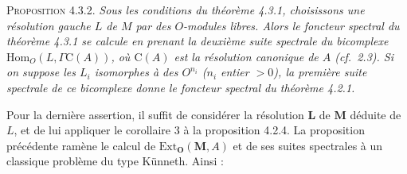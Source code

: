 \textsc{Proposition 4.3.2.} \textit{Sous les conditions du théorème
\textup{4.3.1}, choisissons une résolution gauche $L$ de $M$ par des $O$-modules
libres. Alors le foncteur spectral du théorème \textup{4.3.1} se calcule en prenant la
deuxième suite spectrale du bicomplexe $\mathrm{Hom}_O(L,\Gamma \mathrm C(A))$, où
$\mathrm C(A)$ est la résolution canonique de $A$ \textup{(}cf.\ \textup{2.3)}. Si on suppose les $L_i$
isomorphes à des $O^{n_i}$ \textup{(}$n_i$ entier $>0$\textup{)}, la première suite spectrale de
ce bicomplexe donne le foncteur spectral du théorème \textup{4.2.1}.}

Pour la dernière assertion, il suffit de considérer la résolution $\mathbf L$
de $\mathbf M$ déduite de $L$, et de lui appliquer le corollaire 3 à la
proposition 4.2.4.
La proposition précédente ramène le calcul de
$\mathrm{Ext}_{\mathbf O}(\mathbf M,A)$ et de ses suites spectrales à un
classique problème du type Künneth. Ainsi :

